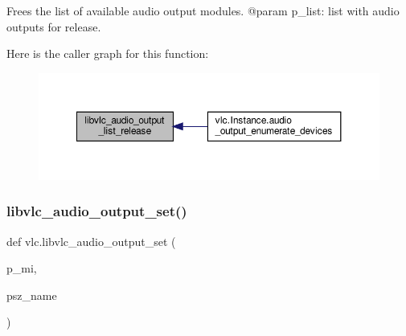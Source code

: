 \begin{DoxyVerb}Frees the list of available audio output modules.
@param p_list: list with audio outputs for release.
\end{DoxyVerb}
 Here is the caller graph for this function\+:
\nopagebreak
\begin{figure}[H]
\begin{center}
\leavevmode
\includegraphics[width=350pt]{namespacevlc_aa3a70d05c0ceda7ef8abf29e5f0237bc_icgraph}
\end{center}
\end{figure}
\mbox{\label{namespacevlc_a78552faa46d9cfa68ff163224b9a5c40}} 
\subsubsection{\texorpdfstring{libvlc\+\_\+audio\+\_\+output\+\_\+set()}{libvlc\_audio\_output\_set()}}
{\footnotesize\ttfamily def vlc.\+libvlc\+\_\+audio\+\_\+output\+\_\+set (\begin{DoxyParamCaption}\item[{}]{p\+\_\+mi,  }\item[{}]{psz\+\_\+name }\end{DoxyParamCaption})}

